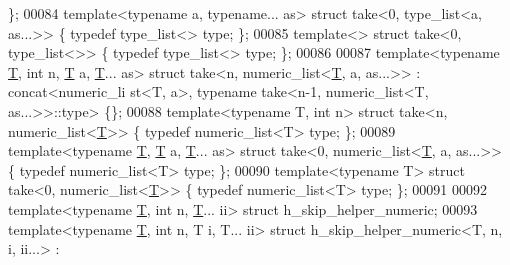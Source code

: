 \begin{DoxyCode}
       \};
00084 \textcolor{keyword}{template}<\textcolor{keyword}{typename} a, \textcolor{keyword}{typename}... as>        \textcolor{keyword}{struct }take<0, type\_list<a, as...>> \{ \textcolor{keyword}{typedef} type\_list<> type;
       \};
00085 \textcolor{keyword}{template}<>                                  \textcolor{keyword}{struct }take<0, type\_list<>>         \{ \textcolor{keyword}{typedef} type\_list<> type;
       \};
00086 
00087 \textcolor{keyword}{template}<\textcolor{keyword}{typename} \hyperlink{group___sparse_core___module_class_eigen_1_1_triplet}{T}, \textcolor{keywordtype}{int} n, \hyperlink{group___sparse_core___module_class_eigen_1_1_triplet}{T} a, \hyperlink{group___sparse_core___module_class_eigen_1_1_triplet}{T}... as> \textcolor{keyword}{struct }take<n, numeric\_list<\hyperlink{group___sparse_core___module_class_eigen_1_1_triplet}{T}, a, as...>> : concat<numeric\_li
      st<T, a>, typename take<n-1, numeric\_list<T, as...>>::type> \{\};
00088 \textcolor{keyword}{template}<\textcolor{keyword}{typename} T, \textcolor{keywordtype}{int} n>               \textcolor{keyword}{struct }take<n, numeric\_list<\hyperlink{group___sparse_core___module_class_eigen_1_1_triplet}{T}>>           \{ \textcolor{keyword}{typedef} 
      numeric\_list<T> type; \};
00089 \textcolor{keyword}{template}<\textcolor{keyword}{typename} \hyperlink{group___sparse_core___module_class_eigen_1_1_triplet}{T}, \hyperlink{group___sparse_core___module_class_eigen_1_1_triplet}{T} a, \hyperlink{group___sparse_core___module_class_eigen_1_1_triplet}{T}... as>        \textcolor{keyword}{struct }take<0, numeric\_list<\hyperlink{group___sparse_core___module_class_eigen_1_1_triplet}{T}, a, as...>> \{ \textcolor{keyword}{typedef} 
      numeric\_list<T> type; \};
00090 \textcolor{keyword}{template}<\textcolor{keyword}{typename} T>                      \textcolor{keyword}{struct }take<0, numeric\_list<\hyperlink{group___sparse_core___module_class_eigen_1_1_triplet}{T}>>           \{ \textcolor{keyword}{typedef} 
      numeric\_list<T> type; \};
00091 
00092 \textcolor{keyword}{template}<\textcolor{keyword}{typename} \hyperlink{group___sparse_core___module_class_eigen_1_1_triplet}{T}, \textcolor{keywordtype}{int} n, \hyperlink{group___sparse_core___module_class_eigen_1_1_triplet}{T}... ii>      \textcolor{keyword}{struct }h\_skip\_helper\_numeric;
00093 \textcolor{keyword}{template}<\textcolor{keyword}{typename} \hyperlink{group___sparse_core___module_class_eigen_1_1_triplet}{T}, \textcolor{keywordtype}{int} n, T i, T... ii> \textcolor{keyword}{struct }h\_skip\_helper\_numeric<T, n, i, ii...> : 

\end{DoxyCode}
